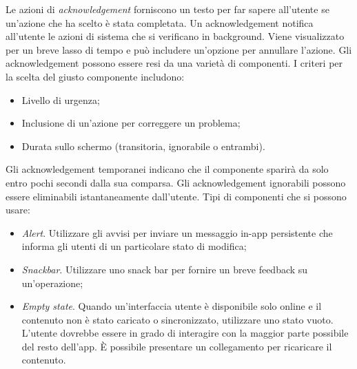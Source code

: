 \documentclass[12pt, a4paper]{report}
\begin{document}
	Le azioni di \textit{acknowledgement} forniscono un testo per far sapere all'utente se un'azione che ha scelto è stata completata. Un acknowledgement notifica all'utente le azioni di sistema che si verificano in background. Viene visualizzato per un breve lasso di tempo e può includere un'opzione per annullare l'azione. Gli acknowledgement possono essere resi da una varietà di componenti. I criteri per la scelta del giusto componente includono:
	\begin{itemize}
		\item Livello di urgenza;
		\item Inclusione di un'azione per correggere un problema;
		\item Durata sullo schermo (transitoria, ignorabile o entrambi).
	\end{itemize}
	Gli acknowledgement temporanei indicano che il componente sparirà da solo entro pochi secondi dalla sua comparsa. Gli acknowledgement ignorabili possono essere eliminabili istantaneamente dall’utente.
	Tipi di componenti che si possono usare:
	\begin{itemize}
		\item \textit{Alert}. Utilizzare gli avvisi per inviare un messaggio in-app persistente che informa gli utenti di un particolare stato di modifica;
		\item \textit{Snackbar}. Utilizzare uno snack bar per fornire un breve feedback su un'operazione;
		\item \textit{Empty state}. Quando un'interfaccia utente è disponibile solo online e il contenuto non è stato caricato o sincronizzato, utilizzare uno stato vuoto. L'utente dovrebbe essere in grado di interagire con la maggior parte possibile del resto dell'app. È possibile presentare un collegamento per ricaricare il contenuto.
	\end{itemize}
\end{document}
